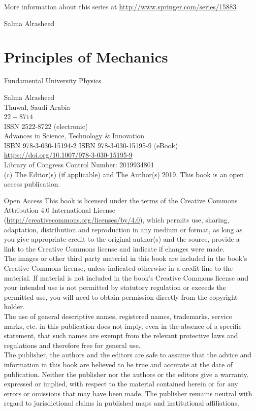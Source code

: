 \documentclass[10pt]{article}
\numberwithin{equation}{section}
\begin{document}
More information about this series at \href{http://www.springer.com/series/15883}{http://www.springer.com/series/15883}

Salma Alrasheed

\section*{Principles of Mechanics}
Fundamental University Physics

Salma Alrasheed\\
Thuwal, Saudi Arabia\\
$22-8714$\\
ISSN 2522-8722 (electronic)\\
Advances in Science, Technology \& Innovation\\
ISBN 978-3-030-15194-2 ISBN 978-3-030-15195-9 (eBook)\\
\href{https://doi.org/10.1007/978-3-030-15195-9}{https://doi.org/10.1007/978-3-030-15195-9}\\
Library of Congress Control Number: 2019934801\\
(c) The Editor(s) (if applicable) and The Author(s) 2019. This book is an open access publication.

Open Access This book is licensed under the terms of the Creative Commons Attribution 4.0 International License (\href{http://creativecommons.org/licenses/by/4.0}{http://creativecommons.org/licenses/by/4.0}), which permits use, sharing, adaptation, distribution and reproduction in any medium or format, as long as you give appropriate credit to the original author(s) and the source, provide a link to the Creative Commons license and indicate if changes were made.\\
The images or other third party material in this book are included in the book's Creative Commons license, unless indicated otherwise in a credit line to the material. If material is not included in the book's Creative Commons license and your intended use is not permitted by statutory regulation or exceeds the permitted use, you will need to obtain permission directly from the copyright holder.\\
The use of general descriptive names, registered names, trademarks, service marks, etc. in this publication does not imply, even in the absence of a specific statement, that such names are exempt from the relevant protective laws and regulations and therefore free for general use.\\
The publisher, the authors and the editors are safe to assume that the advice and information in this book are believed to be true and accurate at the date of publication. Neither the publisher nor the authors or the editors give a warranty, expressed or implied, with respect to the material contained herein or for any errors or omissions that may have been made. The publisher remains neutral with regard to jurisdictional claims in published maps and institutional affiliations.
\end{document}
